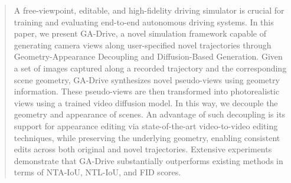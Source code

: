 \begin{abstract}
A free-viewpoint, editable, and high-fidelity driving simulator is crucial for training and evaluating end-to-end autonomous driving systems. In this paper, we present GA-Drive, a novel simulation framework capable of generating camera views along user-specified novel trajectories through Geometry-Appearance Decoupling and Diffusion-Based Generation. Given a set of images captured along a recorded trajectory and the corresponding scene geometry, GA-Drive synthesizes novel pseudo-views using geometry information. These pseudo-views are then transformed into photorealistic views using a trained video diffusion model.
In this way, we decouple the geometry and appearance of scenes.
An advantage of such decoupling is its support for appearance editing via state-of-the-art video-to-video editing techniques, while preserving the underlying geometry, enabling consistent edits across both original and novel trajectories. 
Extensive experiments demonstrate that GA-Drive substantially outperforms existing methods in terms of NTA-IoU, NTL-IoU, and FID scores. 

\end{abstract}